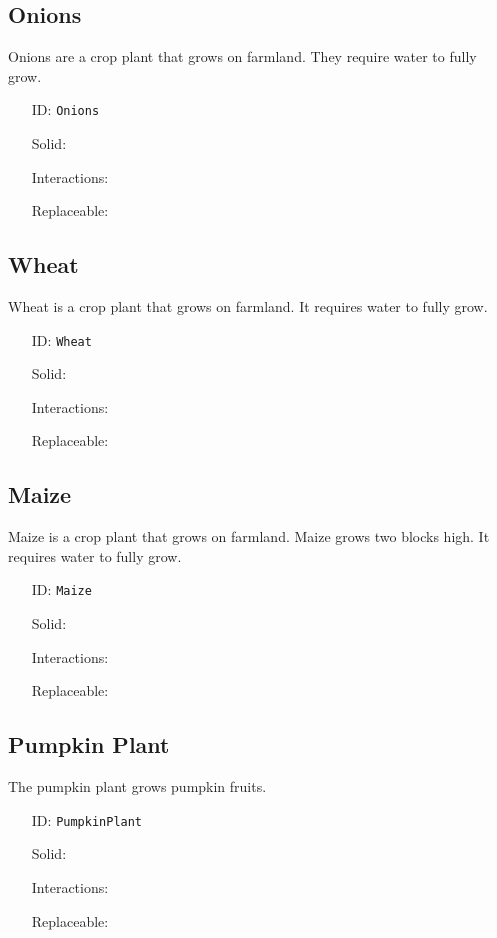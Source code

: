 \subsection{Onions}\label{subsec:blocks_onions}
Onions are a crop plant that grows on farmland. They require water to fully grow.
\newline
\begin{itemize}[nosep]
\item[ID:] \texttt{Onions}
\item[Solid:]  \XSolidBrush \item[Interactions:]  \XSolidBrush \item[Replaceable:]  \XSolidBrush \end{itemize}

\subsection{Wheat}\label{subsec:blocks_wheat}
Wheat is a crop plant that grows on farmland. It requires water to fully grow.
\newline
\begin{itemize}[nosep]
\item[ID:] \texttt{Wheat}
\item[Solid:]  \XSolidBrush \item[Interactions:]  \XSolidBrush \item[Replaceable:]  \XSolidBrush \end{itemize}

\subsection{Maize}\label{subsec:blocks_maize}
Maize is a crop plant that grows on farmland.
                Maize grows two blocks high. It requires water to fully grow.
\newline
\begin{itemize}[nosep]
\item[ID:] \texttt{Maize}
\item[Solid:]  \XSolidBrush \item[Interactions:]  \XSolidBrush \item[Replaceable:]  \XSolidBrush \end{itemize}

\subsection{Pumpkin Plant}\label{subsec:blocks_pumpkin plant}
The pumpkin plant grows pumpkin fruits.
\newline
\begin{itemize}[nosep]
\item[ID:] \texttt{PumpkinPlant}
\item[Solid:]  \XSolidBrush \item[Interactions:]  \XSolidBrush \item[Replaceable:]  \XSolidBrush \end{itemize}


